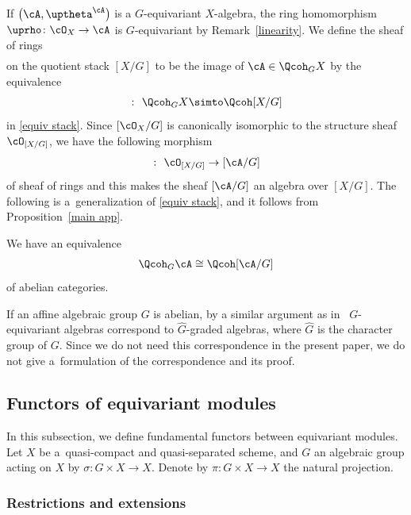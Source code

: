 If $\big(\cA,\uptheta^{\cA}\big)$ is a $G$-equivariant $X$-algebra, the ring homomorphism
$\uprho\colon \cO_X\to \cA$ is $G$-equivariant by Remark~\ref{linearity}. We define the sheaf of rings
 \begin{gather*}
 [\cA/G]
 \end{gather*}
 on the quotient stack $[X/G]$ to be the image of $\cA\in \Qcoh_GX$ by the equivalence
\begin{gather*}
[-/G]\colon\ \Qcoh_GX\simto \Qcoh[X/G]
\end{gather*}
 in \eqref{equiv stack}. Since $[\cO_X/G]$ is canonically isomorphic to the structure sheaf $\cO_{[X/G]}$, we have the following morphism
\begin{gather*}
[\uprho/G]\colon\ \cO_{[X/G]}\to [\cA/G]
\end{gather*}
of sheaf of rings and this makes the sheaf $[\cA/G]$ an algebra over $[X/G]$.
The following is a~generalization of \eqref{equiv stack}, and it follows from Proposition~\ref{main app}.
\begin{prop}\label{quotient correspond}
We have an equivalence
\begin{gather*}
\Qcoh_G\cA\cong \Qcoh [\cA/G]
\end{gather*}
of abelian categories.
\end{prop}

\begin{rem}
If an affine algebraic group $G$ is abelian, by a similar argument as in~\cite[Section~2.1]{bfk2} $G$-equivariant algebras correspond to $\widehat{G}$-graded algebras, where $\widehat{G}$ is the character group of $G$. Since we do not need this correspondence in the present paper, we do not give a~formulation of the correspondence and its proof.
\end{rem}

\subsection{Functors of equivariant modules}
In this subsection, we define fundamental functors between equivariant modules. Let $X$ be a~qua\-si-compact and quasi-separated scheme, and $G$ an algebraic group acting on $X$ by $\sigma\colon G\times X\to X$. Denote by $\pi\colon G\times X\to X$ the natural projection.

\subsubsection{Restrictions and extensions}

